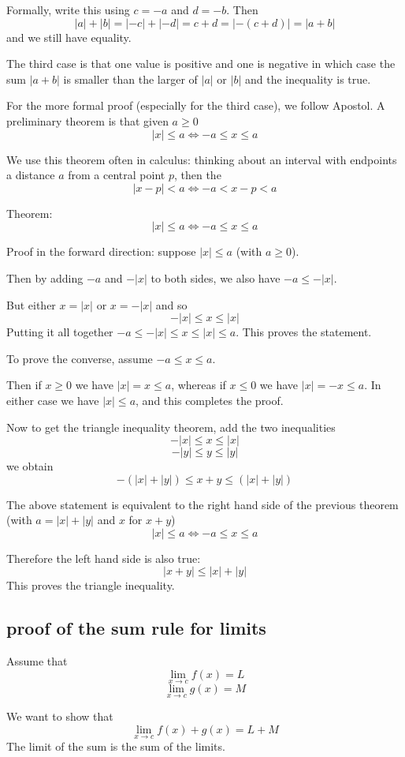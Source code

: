\documentclass[11pt, oneside]{article}   	%
\begin{document}
Formally, write this using $c = -a$ and $d = -b$.  Then
\[ |a| + |b| = |-c| + |-d| = c + d = |-(c+d)| = |a + b| \]
and we still have equality.

The third case is that one value is positive and one is negative in which case the sum $|a+b|$ is smaller than the larger of $|a|$ or $|b|$ and the inequality is true.

For the more formal proof (especially for the third case), we follow Apostol.  A preliminary theorem is that given $a \ge 0$
\[ |x| \le a \iff -a \le x \le a \]

We use this theorem often in calculus:  thinking about an interval with endpoints a distance $a$ from a central point $p$, then the 
\[ |x - p| < a \iff  -a < x - p < a \]

Theorem:
\[ |x| \le a \iff -a \le x \le a \]

Proof in the forward direction:  suppose $|x| \le a$ (with $a \ge 0$).  

Then by adding $-a$ and $- |x|$ to both sides, we also have $-a \le - |x|$.

But either $x = |x|$ or $x = -|x|$ and so
\[ -|x| \le x \le |x| \]
Putting it all together
 $-a \le -|x| \le x \le |x| \le a$.  This proves the statement.

To prove the converse, assume $-a \le x \le a$.

Then if $x \ge 0$ we have $|x| = x \le a$, whereas if $x \le 0$ we have $|x| = - x \le a$.  In either case we have $|x| \le a$, and this completes the proof.

Now to get the triangle inequality theorem, add the two inequalities 
\[ - |x| \le x \le |x| \]
\[ - |y| \le y \le |y| \]
we obtain
\[ - ( |x| +  |y| ) \le x + y \le ( |x| + |y| ) \]

The above statement is equivalent to the right hand side of the previous theorem (with $a = |x| + |y|$ and $x$ for $x+y$)
\[ |x| \le a \iff -a \le x \le a \]

Therefore the left hand side is also true:
\[ | x+y | \le |x| + |y| \]
This proves the triangle inequality.

\subsection*{proof of the sum rule for limits}
Assume that
\[ \lim_{x \rightarrow c} f(x) = L \]
\[ \lim_{x \rightarrow c} g(x) = M \]

We want to show that
\[ \lim_{x \rightarrow c} f(x) + g(x) = L + M \]
The limit of the sum is the sum of the limits.
\end{document}
